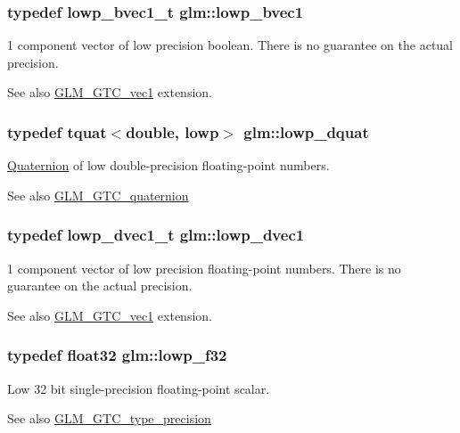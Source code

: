 \subsubsection[{lowp\+\_\+bvec1}]{\setlength{\rightskip}{0pt plus 5cm}typedef lowp\+\_\+bvec1\+\_\+t {\bf glm\+::lowp\+\_\+bvec1}}\label{namespaceglm_af22d6a46a35bcda63801fe78c033f35f}
1 component vector of low precision boolean. There is no guarantee on the actual precision. \begin{DoxySeeAlso}{See also}
\hyperlink{group__gtc__vec1}{G\+L\+M\+\_\+\+G\+T\+C\+\_\+vec1} extension. 
\end{DoxySeeAlso}
\hypertarget{namespaceglm_afd356c86886c573cdd2952e54a59ca94}{}
\subsubsection[{lowp\+\_\+dquat}]{\setlength{\rightskip}{0pt plus 5cm}typedef {\bf tquat}$<$double, lowp$>$ {\bf glm\+::lowp\+\_\+dquat}}\label{namespaceglm_afd356c86886c573cdd2952e54a59ca94}
\hyperlink{class_quaternion}{Quaternion} of low double-\/precision floating-\/point numbers.

\begin{DoxySeeAlso}{See also}
\hyperlink{group__gtc__quaternion}{G\+L\+M\+\_\+\+G\+T\+C\+\_\+quaternion} 
\end{DoxySeeAlso}
\hypertarget{namespaceglm_a1c35f3740df7d57374db693074272cc6}{}
\subsubsection[{lowp\+\_\+dvec1}]{\setlength{\rightskip}{0pt plus 5cm}typedef lowp\+\_\+dvec1\+\_\+t {\bf glm\+::lowp\+\_\+dvec1}}\label{namespaceglm_a1c35f3740df7d57374db693074272cc6}
1 component vector of low precision floating-\/point numbers. There is no guarantee on the actual precision. \begin{DoxySeeAlso}{See also}
\hyperlink{group__gtc__vec1}{G\+L\+M\+\_\+\+G\+T\+C\+\_\+vec1} extension. 
\end{DoxySeeAlso}
\hypertarget{namespaceglm_a1b9734de4b4429dc26b1454a2a399b05}{}
\subsubsection[{lowp\+\_\+f32}]{\setlength{\rightskip}{0pt plus 5cm}typedef {\bf float32} {\bf glm\+::lowp\+\_\+f32}}\label{namespaceglm_a1b9734de4b4429dc26b1454a2a399b05}
Low 32 bit single-\/precision floating-\/point scalar. \begin{DoxySeeAlso}{See also}
\hyperlink{group__gtc__type__precision}{G\+L\+M\+\_\+\+G\+T\+C\+\_\+type\+\_\+precision} 
\end{DoxySeeAlso}
\hypertarget{namespaceglm_ad717448ef1129d7b795ebcfee6c4944c}{}
